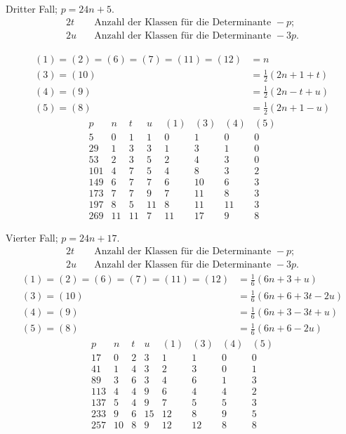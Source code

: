 Dritter Fall; $p=24n+5$.
\[
\begin{aligned}
2t&\quad\text{Anzahl der Klassen für die Determinante }-p;\\
2u&\quad\text{Anzahl der Klassen für die Determinante }-3p.
\end{aligned}
\]

\[
\begin{aligned}
(1)=(2)=(6)=(7)=(11)=(12)&=n\\
(3)=(10)&=\tfrac12(2n+1+t)\\
(4)=(9)&=\tfrac12(2n-t+u)\\
(5)=(8)&=\tfrac12(2n+1-u)
\end{aligned}
\]
\[
\begin{array}{r|r|r|r|r|r|r|r}
p&n&t&u&(1)&(3)&(4)&(5)\\\hline
5&0&1&1&0&1&0&0\\
29&1&3&3&1&3&1&0\\
53&2&3&5&2&4&3&0\\
101&4&7&5&4&8&3&2\\
149&6&7&7&6&10&6&3\\
173&7&7&9&7&11&8&3\\
197&8&5&11&8&11&11&3\\
269&11&11&7&11&17&9&8
\end{array}
\]

Vierter Fall; $p=24n+17$.
\[
\begin{aligned}
2t&\quad\text{Anzahl der Klassen für die Determinante }-p;\\
2u&\quad\text{Anzahl der Klassen für die Determinante }-3p.
\end{aligned}
\]
\[
\begin{aligned}
(1)=(2)=(6)=(7)=(11)=(12)&=\tfrac16(6n+3+u)\\
(3)=(10)&=\tfrac16(6n+6+3t-2u)\\
(4)=(9)&=\tfrac16(6n+3-3t+u)\\
(5)=(8)&=\tfrac16(6n+6-2u)
\end{aligned}
\]
\[
\begin{array}{r|r|r|r|r|r|r|r}
p&n&t&u&(1)&(3)&(4)&(5)\\\hline
17&0&2&3&1&1&0&0\\
41&1&4&3&2&3&0&1\\
89&3&6&3&4&6&1&3\\
113&4&4&9&6&4&4&2\\
137&5&4&9&7&5&5&3\\
233&9&6&15&12&8&9&5\\
257&10&8&9&12&12&8&8
\end{array}
\]
